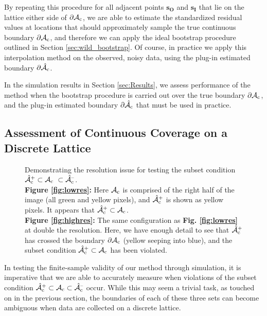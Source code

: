 By repeating this procedure for all adjacent points $\bm{s_O}$ and $\bm{s_I}$ that lie on the lattice  either side of $\operatorname{\partial\mathcal{A}_{c}}$, we are able to estimate the standardized residual values at locations that should approximately sample the true continuous boundary $\operatorname{\partial\mathcal{A}_{c}}$, and therefore we can apply the ideal bootstrap procedure outlined in Section \ref{sec:wild_bootstrap}. Of course, in practice we apply this interpolation method on the observed, noisy data, using the plug-in estimated boundary $\operatorname{\partial\hat{\mathcal{A}}_{c}}$. 

In the simulation results in Section \ref{sec:Results}, we assess performance of the method when the bootstrap procedure is carried out over the true boundary $\operatorname{\partial\mathcal{A}_{c}}$, and the plug-in estimated boundary $\operatorname{\partial\hat{\mathcal{A}}_{c}}$ that must be used in practice. 

\subsection{Assessment of Continuous Coverage on a Discrete Lattice}
\label{sec:coverage_assessment}

\begin{figure}[htbp]%
\centering
{}
\caption{Demonstrating the resolution issue for testing the subset condition $\operatorname{\hat{\mathcal{A}}_{c}^+} \subset \operatorname{\mathcal{A}_{c}} \ \subset \operatorname{\hat{\mathcal{A}}_{c}^{\textrm{--}}}$. \\ \textbf{Figure \ref{fig:lowres}:} Here $\operatorname{\mathcal{A}_{c}}$ is comprised of the right half of the image (all green and yellow pixels), and $\operatorname{\hat{\mathcal{A}}_{c}^+}$ is shown as yellow pixels. It appears that $\operatorname{\hat{\mathcal{A}}_{c}^+} \subset \operatorname{\mathcal{A}_{c}}$. \\ \textbf{Figure \ref{fig:highres}:} The same configuration as \textbf{Fig. \ref{fig:lowres}} at double the resolution. Here, we have enough detail to see that $\operatorname{\hat{\mathcal{A}}_{c}^+}$ has crossed the boundary $\operatorname{\partial\mathcal{A}_{c}}$ (yellow seeping into blue), and the subset condition $\operatorname{\hat{\mathcal{A}}_{c}^+} \subset \operatorname{\mathcal{A}_{c}}$ has been violated.}
\label{fig:highres_lowres}
\end{figure}

In testing the finite-sample validity of our method through simulation, it is imperative that we are able to accurately measure when violations of the subset condition $\operatorname{\hat{\mathcal{A}}_{c}^+} \subset \operatorname{\mathcal{A}_{c}} \subset \operatorname{\hat{\mathcal{A}}_{c}^{\textrm{--}}}$ occur. 
While this may seem a trivial task, as touched on in the previous section, the boundaries of each of these three sets can become ambiguous when data are collected on a discrete lattice. 

